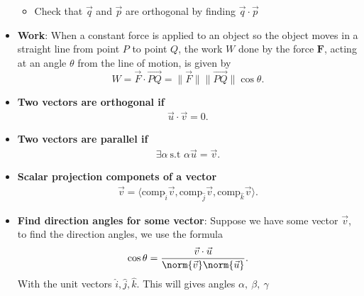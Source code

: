 \documentclass{report}
\begin{document}
\begin{itemize}
\begin{itemize}
                    \item Check that $\vec{q}$ and $\vec{p}$ are orthogonal by finding $\vec{q} \cdot \vec{p}$
                \end{itemize}
            \item \textbf{Work}:
                When a constant force is applied to an object so the object moves in a straight line from point $P$ to point $Q$, the work $W$ done by the force $\mathbf{F}$, acting at an angle $\theta$ from the line of motion, is given by
                \[ W = \vec{F} \cdot \overrightarrow{PQ} = \|\vec{F}\| \|\overrightarrow{PQ}\| \cos \theta. \]
            \item \textbf{Two vectors are orthogonal if}
                \begin{align*}
                    \vec{u} \cdot \vec{v} = 0
                .\end{align*}
            \item \textbf{Two vectors are parallel if}
                \begin{align*}
                    \exists \alpha\ \text{s.t } \alpha\vec{u} = \vec{v}
                .\end{align*}
            \item \textbf{Scalar projection componets of a vector}
                \begin{align*}
                    \vec{v} = \langle \text{comp}_{\hat{i}}\vec{v}, \text{comp}_{\hat{j}}\vec{v}, \text{comp}_{\hat{k}}\vec{v}\rangle
                .\end{align*}
            \item \textbf{Find direction angles for some vector}: Suppose we have some vector $\vec{v}$, to find the direction angles, we use the formula
                \begin{align*}
                    \cos{\theta} = \frac{\vec{v} \cdot \vec{u}}{\norm{\vec{v}} \norm{\vec{u}}}
                .\end{align*}
                With the unit vectors $\hat{i}, \hat{j}, \hat{k}$. This will gives angles $\alpha,\ \beta,\ \gamma $


\end{itemize}
\end{document}
